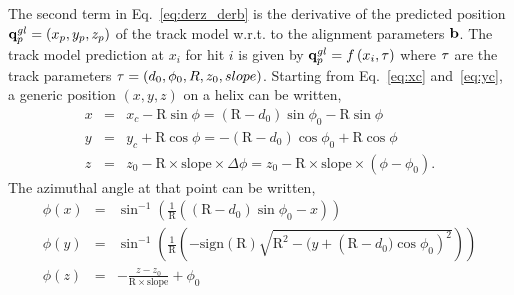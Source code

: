 \documentclass{article}
\def\R{\ensuremath{\mathrm{R}}}
\def\slope{\ensuremath{\mathrm{slope}}}
\def\dphi{\ensuremath{\Delta\phi}}
\def\sign#1{\ensuremath{\mathrm{sign}\left(#1\right)}}
\def\vec#1{\ensuremath{\mathrm{\bf #1}}}
\begin{document}
The second term in Eq.~\ref{eq:derz_derb} is the derivative of the predicted position 
$\vec{q}^{gl}_p=(x_p,y_p,z_p)$ of the track model w.r.t. to the 
alignment parameters $\vec{b}$. The track model prediction at $x_i$ for hit $i$ is given by 
$\vec{q}^{gl}_p=f\left(x_i, \vec{\tau}\right)$ where $\vec{\tau}$ are the track parameters $\vec{\tau}=\left(d_0, \phi_0,R,z_0,slope \right)$. Starting from Eq.~\ref{eq:xc} and~\ref{eq:yc}, a generic position $(x,y,z)$ on a helix 
can be written, 
\begin{eqnarray}
x &=& x_c - \R\sin\phi = (\R-d_0)\sin\phi_0 - \R\sin\phi \nonumber \\ 
y &=& y_c + \R\cos\phi = -(\R-d_0)\cos\phi_0 + \R\cos\phi  \\
z &=& z_0 - \R\times\slope\times\dphi = z_0 - \R\times\slope\times(\phi-\phi_0). \nonumber
\end{eqnarray}
The azimuthal angle at that point can be written,
\begin{eqnarray}
\phi(x) &=& \sin^{-1}\left( \frac{1}{\R} \left(  (\R-d_0)\sin\phi_0 - x   \right)  \right)\\
\phi(y) &=& \sin^{-1}\left( \frac{1}{\R} \left(-\sign{\R} \sqrt{ \R^2 - (y + \left(\R - d_0)\cos\phi_0\right)^2} \right)  \right) \\
\phi(z) &=& -\frac{z -z_0}{\R\times\slope} + \phi_0 \label{phifromatan} 
\end{eqnarray}
\end{document}
